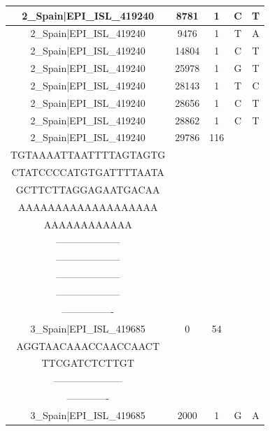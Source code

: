 \documentclass[a4paper,10pt]{article}
\begin{document}
\begin{longtable}{@{}ccccc@{}}
2\_Spain|EPI\_ISL\_419240 & 8781 & 1 & C & T \\* \midrule
2\_Spain|EPI\_ISL\_419240 & 9476 & 1 & T & A \\* \midrule
2\_Spain|EPI\_ISL\_419240 & 14804 & 1 & C & T \\* \midrule
2\_Spain|EPI\_ISL\_419240 & 25978 & 1 & G & T \\* \midrule
2\_Spain|EPI\_ISL\_419240 & 28143 & 1 & T & C \\* \midrule
2\_Spain|EPI\_ISL\_419240 & 28656 & 1 & C & T \\* \midrule
2\_Spain|EPI\_ISL\_419240 & 28862 & 1 & C & T \\* \midrule
2\_Spain|EPI\_ISL\_419240 & 29786 & 116 & \begin{tabular}[c]{@{}c@{}}CTATATGGAAGAGCCCTAATG\\ TGTAAAATTAATTTTAGTAGTG\\ CTATCCCCATGTGATTTTAATA\\ GCTTCTTAGGAGAATGACAA\\ AAAAAAAAAAAAAAAAAAA\\ AAAAAAAAAAAA\end{tabular} & \begin{tabular}[c]{@{}c@{}}--------------------\\ --------------------\\ --------------------\\ --------------------\\ --------------------\\ ----------------\end{tabular} \\* \midrule
3\_Spain|EPI\_ISL\_419685 & 0 & 54 & \begin{tabular}[c]{@{}c@{}}ATTAAAGGTTTATACCTTCCC\\ AGGTAACAAACCAACCAACT\\ TTCGATCTCTTGT\end{tabular} & \begin{tabular}[c]{@{}c@{}}--------------------\\ ---------------------\\ -------------\end{tabular} \\* \midrule
3\_Spain|EPI\_ISL\_419685 & 2000 & 1 & G & A \\* \midrule

\end{longtable}
\end{document}
